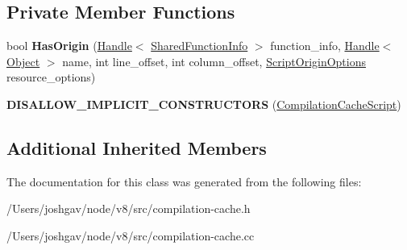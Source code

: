 \subsection*{Private Member Functions}
\begin{DoxyCompactItemize}
\item 
bool {\bfseries Has\+Origin} (\hyperlink{classv8_1_1internal_1_1_handle}{Handle}$<$ \hyperlink{classv8_1_1internal_1_1_shared_function_info}{Shared\+Function\+Info} $>$ function\+\_\+info, \hyperlink{classv8_1_1internal_1_1_handle}{Handle}$<$ \hyperlink{classv8_1_1internal_1_1_object}{Object} $>$ name, int line\+\_\+offset, int column\+\_\+offset, \hyperlink{classv8_1_1_script_origin_options}{Script\+Origin\+Options} resource\+\_\+options)\hypertarget{classv8_1_1internal_1_1_compilation_cache_script_acb5dcbb88049cb7778ad71a3c3be09a6}{}\label{classv8_1_1internal_1_1_compilation_cache_script_acb5dcbb88049cb7778ad71a3c3be09a6}

\item 
{\bfseries D\+I\+S\+A\+L\+L\+O\+W\+\_\+\+I\+M\+P\+L\+I\+C\+I\+T\+\_\+\+C\+O\+N\+S\+T\+R\+U\+C\+T\+O\+RS} (\hyperlink{classv8_1_1internal_1_1_compilation_cache_script}{Compilation\+Cache\+Script})\hypertarget{classv8_1_1internal_1_1_compilation_cache_script_a5a4549d7af1b6243876711b4adcc0780}{}\label{classv8_1_1internal_1_1_compilation_cache_script_a5a4549d7af1b6243876711b4adcc0780}

\end{DoxyCompactItemize}
\subsection*{Additional Inherited Members}


The documentation for this class was generated from the following files\+:\begin{DoxyCompactItemize}
\item 
/\+Users/joshgav/node/v8/src/compilation-\/cache.\+h\item 
/\+Users/joshgav/node/v8/src/compilation-\/cache.\+cc\end{DoxyCompactItemize}
